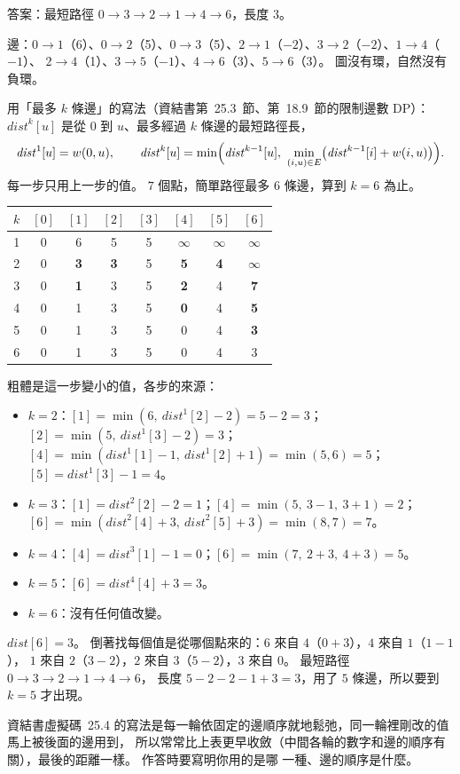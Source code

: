 \begin{pastsoln}
答案：最短路徑 $0 \to 3 \to 2 \to 1 \to 4 \to 6$，長度 $3$。

邊：$0 \to 1$（6）、$0 \to 2$（5）、$0 \to 3$（5）、$2 \to 1$（$-2$）、$3 \to 2$（$-2$）、$1 \to 4$（$-1$）、
$2 \to 4$（1）、$3 \to 5$（$-1$）、$4 \to 6$（3）、$5 \to 6$（3）。 圖沒有環，自然沒有負環。

用「最多 $k$ 條邊」的寫法（資結書第~25.3~節、第~18.9~節的限制邊數 DP）：$\mathit{dist}^k[u]$ 是從 $0$
到 $u$、最多經過 $k$ 條邊的最短路徑長，
\[
\mathit{dist}^1[u] = w(0, u),\qquad
\mathit{dist}^k[u] = \min\Bigl(\mathit{dist}^{k-1}[u],\ \min_{(i, u) \in E}\bigl(\mathit{dist}^{k-1}[i] + w(i, u)\bigr)\Bigr).
\]
每一步只用上一步的值。 $7$ 個點，簡單路徑最多 $6$ 條邊，算到 $k = 6$ 為止。
\begin{center}
\begin{tabular}{c*{7}{c}}
\toprule
$k$ & $[0]$ & $[1]$ & $[2]$ & $[3]$ & $[4]$ & $[5]$ & $[6]$ \\
\midrule
1 & 0 & 6 & 5 & 5 & $\infty$ & $\infty$ & $\infty$ \\
2 & 0 & \textbf{3} & \textbf{3} & 5 & \textbf{5} & \textbf{4} & $\infty$ \\
3 & 0 & \textbf{1} & 3 & 5 & \textbf{2} & 4 & \textbf{7} \\
4 & 0 & 1 & 3 & 5 & \textbf{0} & 4 & \textbf{5} \\
5 & 0 & 1 & 3 & 5 & 0 & 4 & \textbf{3} \\
6 & 0 & 1 & 3 & 5 & 0 & 4 & 3 \\
\bottomrule
\end{tabular}
\end{center}
粗體是這一步變小的值，各步的來源：
\begin{itemize}
\item $k = 2$：$[1] = \min(6,\ \mathit{dist}^1[2] - 2) = 5 - 2 = 3$；$[2] = \min(5,\ \mathit{dist}^1[3] - 2) = 3$；
$[4] = \min(\mathit{dist}^1[1] - 1,\ \mathit{dist}^1[2] + 1) = \min(5, 6) = 5$；$[5] = \mathit{dist}^1[3] - 1 = 4$。
\item $k = 3$：$[1] = \mathit{dist}^2[2] - 2 = 1$；$[4] = \min(5,\ 3 - 1,\ 3 + 1) = 2$；
$[6] = \min(\mathit{dist}^2[4] + 3,\ \mathit{dist}^2[5] + 3) = \min(8, 7) = 7$。
\item $k = 4$：$[4] = \mathit{dist}^3[1] - 1 = 0$；$[6] = \min(7,\ 2 + 3,\ 4 + 3) = 5$。
\item $k = 5$：$[6] = \mathit{dist}^4[4] + 3 = 3$。
\item $k = 6$：沒有任何值改變。
\end{itemize}

$\mathit{dist}[6] = 3$。 倒著找每個值是從哪個點來的：$6$ 來自 $4$（$0 + 3$），$4$ 來自 $1$（$1 - 1$），
$1$ 來自 $2$（$3 - 2$），$2$ 來自 $3$（$5 - 2$），$3$ 來自 $0$。 最短路徑 $0 \to 3 \to 2 \to 1 \to 4 \to 6$，
長度 $5 - 2 - 2 - 1 + 3 = 3$，用了 $5$ 條邊，所以要到 $k = 5$ 才出現。

資結書虛擬碼~25.4 的寫法是每一輪依固定的邊順序就地鬆弛，同一輪裡剛改的值馬上被後面的邊用到，
所以常常比上表更早收斂（中間各輪的數字和邊的順序有關），最後的距離一樣。 作答時要寫明你用的是哪
一種、邊的順序是什麼。
\end{pastsoln}
